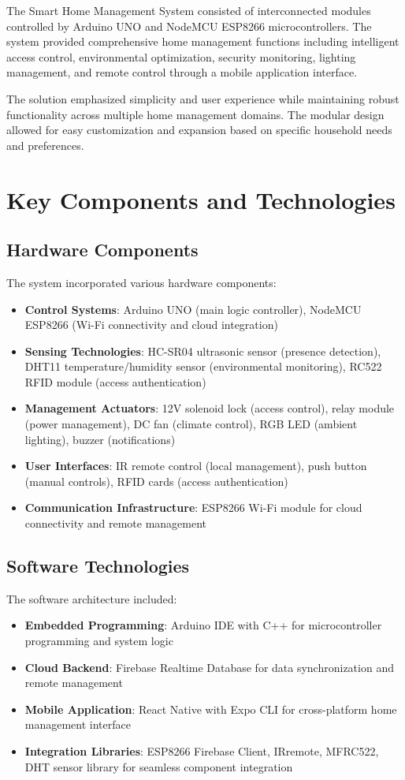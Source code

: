 \documentclass[12pt,a4paper]{report}
\begin{document}
\noindent The Smart Home Management System consisted of interconnected modules controlled by Arduino UNO and NodeMCU ESP8266 microcontrollers. The system provided comprehensive home management functions including intelligent access control, environmental optimization, security monitoring, lighting management, and remote control through a mobile application interface.

\noindent The solution emphasized simplicity and user experience while maintaining robust functionality across multiple home management domains. The modular design allowed for easy customization and expansion based on specific household needs and preferences.

\section{Key Components and Technologies}

\subsection{Hardware Components}
\noindent The system incorporated various hardware components:
\begin{itemize}
\item \textbf{Control Systems}: Arduino UNO (main logic controller), NodeMCU ESP8266 (Wi-Fi connectivity and cloud integration)
\item \textbf{Sensing Technologies}: HC-SR04 ultrasonic sensor (presence detection), DHT11 temperature/humidity sensor (environmental monitoring), RC522 RFID module (access authentication)
\item \textbf{Management Actuators}: 12V solenoid lock (access control), relay module (power management), DC fan (climate control), RGB LED (ambient lighting), buzzer (notifications)
\item \textbf{User Interfaces}: IR remote control (local management), push button (manual controls), RFID cards (access authentication)
\item \textbf{Communication Infrastructure}: ESP8266 Wi-Fi module for cloud connectivity and remote management
\end{itemize}

\subsection{Software Technologies}
\noindent The software architecture included:
\begin{itemize}
\item \textbf{Embedded Programming}: Arduino IDE with C++ for microcontroller programming and system logic
\item \textbf{Cloud Backend}: Firebase Realtime Database for data synchronization and remote management
\item \textbf{Mobile Application}: React Native with Expo CLI for cross-platform home management interface
\item \textbf{Integration Libraries}: ESP8266 Firebase Client, IRremote, MFRC522, DHT sensor library for seamless component integration
\end{itemize}
\end{document}
